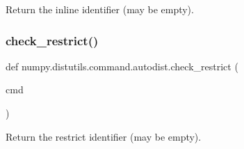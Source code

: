 \begin{DoxyVerb}Return the inline identifier (may be empty).\end{DoxyVerb}
 \mbox{\label{namespacenumpy_1_1distutils_1_1command_1_1autodist_ab6ef0b2d2c101357603bd0c5fb28f674}} 
\subsubsection{\texorpdfstring{check\+\_\+restrict()}{check\_restrict()}}
{\footnotesize\ttfamily def numpy.\+distutils.\+command.\+autodist.\+check\+\_\+restrict (\begin{DoxyParamCaption}\item[{}]{cmd }\end{DoxyParamCaption})}

\begin{DoxyVerb}Return the restrict identifier (may be empty).\end{DoxyVerb}
 